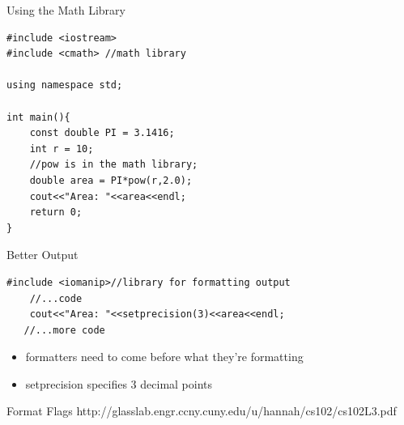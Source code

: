 \documentclass[xcolor={dvipsnames}]{beamer}
\begin{document}
\begin{frame}[fragile]{Using the Math Library}
\begin{verbatim}
#include <iostream>
#include <cmath> //math library

using namespace std;

int main(){
    const double PI = 3.1416;
    int r = 10;
    //pow is in the math library;
    double area = PI*pow(r,2.0);
    cout<<"Area: "<<area<<endl;
    return 0;
}
\end{verbatim}
\end{frame} 

\begin{frame}[fragile]{Better Output}
\begin{verbatim}
#include <iomanip>//library for formatting output
    //...code
    cout<<"Area: "<<setprecision(3)<<area<<endl;
   //...more code
\end{verbatim}

\begin{block}{}
	\begin{itemize}
		\item formatters need to come before what they're formatting
		\item setprecision specifies 3 decimal points
	\end{itemize}
\end{block}
\end{frame}

\begin{frame}{Format Flags}
http://glasslab.engr.ccny.cuny.edu/u/hannah/cs102/cs102L3.pdf
\end{frame}
\end{document}
